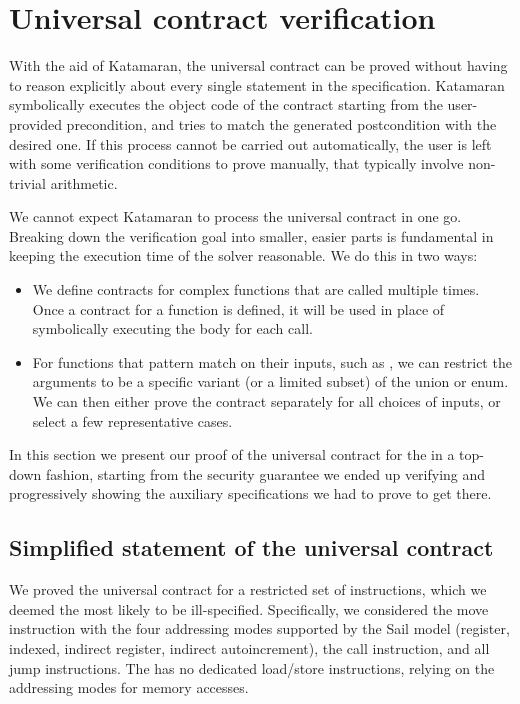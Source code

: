 \section{Universal contract verification}

With the aid of Katamaran, the universal contract can be proved without having to reason explicitly about every single statement in the \usail specification. Katamaran symbolically executes the object code of the contract starting from the user-provided precondition, and tries to match the generated postcondition with the desired one. If this process cannot be carried out automatically, the user is left with some verification conditions to prove manually, that typically involve non-trivial arithmetic.


We cannot expect Katamaran to process the universal contract in one go. Breaking down the verification goal into smaller, easier parts is fundamental in keeping the execution time of the solver reasonable. We do this in two ways:
\begin{itemize}
\item We define contracts for complex functions that are called multiple times. Once a contract for a function is defined, it will be used in place of symbolically executing the body for each call.
\item For functions that pattern match on their inputs, such as , we can restrict the arguments to be a specific variant (or a limited subset) of the union or enum. We can then either prove the contract separately for all choices of inputs, or select a few representative cases.
\end{itemize}

In this section we present our proof of the universal contract for the \msp in a top-down fashion, starting from the security guarantee we ended up verifying and progressively showing the auxiliary specifications we had to prove to get there.

\subsection{Simplified statement of the universal contract}
\label{sec:uc-simple}

We proved the universal contract for a restricted set of instructions, which we deemed the most likely to be ill-specified. Specifically, we considered the move instruction with the four addressing modes supported by the Sail model (register, indexed, indirect register, indirect autoincrement), the call instruction, and all jump instructions. The \msp has no dedicated load/store instructions, relying on the addressing modes for memory accesses.

